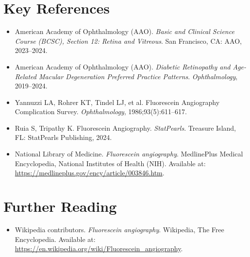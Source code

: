 \section{Key References}

\begin{itemize}
    \item American Academy of Ophthalmology (AAO). \textit{Basic and Clinical Science Course (BCSC), Section 12: Retina and Vitreous}. San Francisco, CA: AAO, 2023--2024.
    \item American Academy of Ophthalmology (AAO). \textit{Diabetic Retinopathy and Age-Related Macular Degeneration Preferred Practice Patterns}. \textit{Ophthalmology}, 2019--2024.
    \item Yannuzzi LA, Rohrer KT, Tindel LJ, et al. Fluorescein Angiography Complication Survey. \textit{Ophthalmology}, 1986;93(5):611--617.
    \item Ruia S, Tripathy K. Fluorescein Angiography. \textit{StatPearls}. Treasure Island, FL: StatPearls Publishing, 2024.
    \item National Library of Medicine. \textit{Fluorescein angiography}. MedlinePlus Medical Encyclopedia, National Institutes of Health (NIH). Available at: \url{https://medlineplus.gov/ency/article/003846.htm}.
\end{itemize}

\section{Further Reading}
\begin{itemize}
  \item Wikipedia contributors. \textit{Fluorescein angiography}. Wikipedia, The Free Encyclopedia. Available at: \url{https://en.wikipedia.org/wiki/Fluorescein_angiography}.
\end{itemize}
